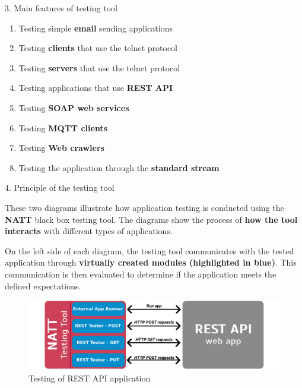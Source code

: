 \documentclass[final]{beamer}
\newlength{\colwidth}
\begin{document}
\begin{frame}[t]
\begin{columns}[t]
\begin{column}{\colwidth}
\begin{alertblock}{3. Main features of testing tool}
    \begin{enumerate}
      \item Testing simple \textbf{email} sending applications
      \item Testing \textbf{clients} that use the telnet protocol
      \item Testing \textbf{servers} that use the telnet protocol
      \item Testing applications that use \textbf{REST API}
      \item Testing \textbf{SOAP web services}
      \item Testing \textbf{MQTT clients}
      \item Testing \textbf{Web crawlers}
      \item Testing the application through the \textbf{standard stream}
    \end{enumerate}

  \end{alertblock}

  \begin{block}{4. Principle of the testing tool}

    These two diagrams illustrate how application testing is conducted using the \textbf{NATT}
    black box testing tool. The diagrams show the process of \textbf{how the tool interacts} 
    with different types of applications. 

    \hspace{2em} On the left side of each diagram, the testing tool communicates with 
    the tested application through \textbf{virtually created modules (highlighted in blue)}. This 
    communication is then evaluated to determine if the application meets the defined
    expectations.

    \begin{figure}
      \centering
        \includegraphics[width=1.0\textwidth]{./imgs/simple-rest-diagram.png}
      \caption{Testing of REST API application}
    \end{figure}


\end{block}
\end{column}
\end{columns}
\end{frame}
\end{document}
